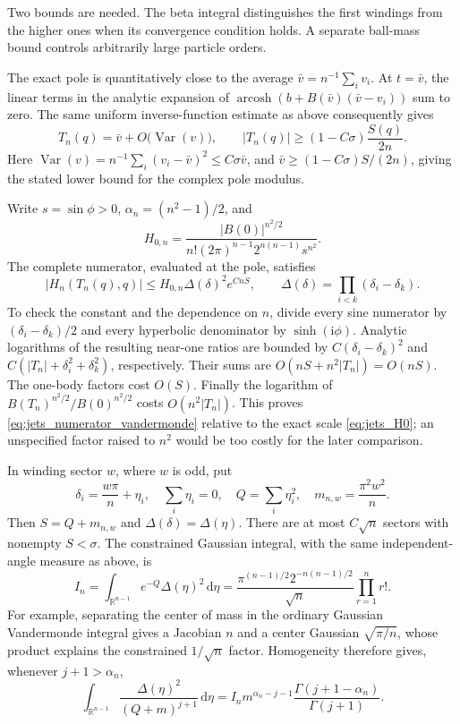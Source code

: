 \documentclass[11pt]{article}
\numberwithin{equation}{section}
\theoremstyle{definition}
\newcommand{\R}{\mathbb R}
\newcommand{\dd}{\,\mathrm d}
\newcommand{\ii}{\mathrm i}
\begin{document}
Two bounds are needed. The beta integral distinguishes the first
windings from the higher ones when its convergence condition holds.
A separate ball-mass bound controls arbitrarily large particle orders.

The exact pole is quantitatively close to the average
$\bar v=n^{-1}\sum_i v_i$. At $t=\bar v$, the linear terms in the
analytic expansion of
$\operatorname{arcosh}(b+B(\bar v)(\bar v-v_i))$ sum to zero.
The same uniform inverse-function estimate as above consequently gives
\begin{equation}\label{eq:jets_pole_lower}
 T_n(q)=\bar v+O\bigl(\operatorname{Var}(v)\bigr),\qquad
 |T_n(q)|\ge (1-C\sigma)\frac{S(q)}{2n}.
\end{equation}
Here $\operatorname{Var}(v)=n^{-1}\sum_i(v_i-\bar v)^2\le
C\sigma\bar v$, and
$\bar v\ge (1-C\sigma)S/(2n)$, giving the stated lower bound for
the complex pole modulus.

Write $s=\sin\phi>0$, $\alpha_n=(n^2-1)/2$, and
\begin{equation}\label{eq:jets_H0}
 H_{0,n}=\frac{|B(0)|^{n^2/2}}
 {n!(2\pi)^{n-1}2^{n(n-1)}s^{n^2}}.
\end{equation}
The complete numerator, evaluated at the pole, satisfies
\begin{equation}\label{eq:jets_numerator_vandermonde}
 |H_n(T_n(q),q)|\le H_{0,n}\Delta(\delta)^2 e^{CnS},
 \qquad \Delta(\delta)=\prod_{i<k}(\delta_i-\delta_k).
\end{equation}
To check the constant and the dependence on $n$, divide every sine
numerator by $(\delta_i-\delta_k)/2$ and every hyperbolic
denominator by $\sinh(\ii\phi)$. Analytic logarithms of the
resulting near-one ratios are bounded by
$C(\delta_i-\delta_k)^2$ and
$C(|T_n|+\delta_i^2+\delta_k^2)$, respectively. Their sums are
$O(nS+n^2|T_n|)=O(nS)$. The one-body factors cost $O(S)$.
Finally the logarithm of
$B(T_n)^{n^2/2}/B(0)^{n^2/2}$ costs $O(n^2|T_n|)$.
This proves \eqref{eq:jets_numerator_vandermonde} relative to the exact
scale \eqref{eq:jets_H0}; an unspecified factor raised to $n^2$ would
be too costly for the later comparison.

In winding sector $w$, where $w$ is odd, put
\[
 \delta_i=\frac{w\pi}{n}+\eta_i,\quad
 \sum_i\eta_i=0,\quad Q=\sum_i\eta_i^2,\quad
 m_{n,w}=\frac{\pi^2w^2}{n}.
\]
Then $S=Q+m_{n,w}$ and $\Delta(\delta)=\Delta(\eta)$.
There are at most $C\sqrt n$ sectors with nonempty $S<\sigma$.
The constrained Gaussian integral, with the same independent-angle
measure as above, is
\begin{equation}\label{eq:jets_Mehta}
 I_n=\int_{\R^{n-1}}e^{-Q}\Delta(\eta)^2\dd\eta
 =\frac{\pi^{(n-1)/2}2^{-n(n-1)/2}}{\sqrt n}
   \prod_{r=1}^n r!.
\end{equation}
For example, separating the center of mass in the ordinary Gaussian
Vandermonde integral gives a Jacobian $n$ and a center Gaussian
$\sqrt{\pi/n}$, whose product explains the constrained
$1/\sqrt n$ factor. Homogeneity therefore gives, whenever
$j+1>\alpha_n$,
\begin{equation}\label{eq:jets_beta_integral}
 \int_{\R^{n-1}}\frac{\Delta(\eta)^2}{(Q+m)^{j+1}}\dd\eta
 =I_n m^{\alpha_n-j-1}
       \frac{\Gamma(j+1-\alpha_n)}{\Gamma(j+1)}.
\end{equation}
\end{document}
